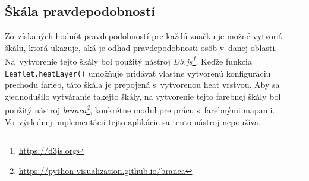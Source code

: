 \subsection*{Škála pravdepodobností}
Zo~získaných hodnôt pravdepodobností pre každú značku je možné vytvoriť škálu, ktorá ukazuje, aká je odhad pravdepodobnosti osôb v~danej oblasti. Na~vytvorenie tejto škály bol použitý nástroj \emph{D3.js\footnote{\url{https://d3js.org}}}. Keďže funkcia \texttt{Leaflet.heatLayer()} umožňuje pridávať vlastne vytvorenú konfiguráciu prechodu farieb, táto škála je prepojená s~vytvorenou heat vrstvou. Aby sa zjednodušilo vytváranie takejto škály, na vytvorenie tejto farebnej škály bol použitý nástroj \emph{branca\footnote{\url{https://python-visualization.github.io/branca}}}, konkrétne modul pre prácu s~farebnými mapami. Vo~výslednej implementácii tejto aplikácie sa tento nástroj nepoužíva.









